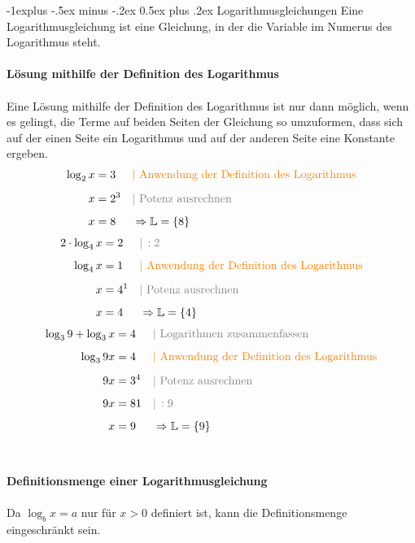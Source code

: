 \documentclass[a4paper,10pt]{article}
\makeatletter
\renewcommand{\subsection}{\@startsection{subsection}{2}{0mm}%
                                {-1explus -.5ex minus -.2ex}%
                                {0.5ex plus .2ex}%
                                {\normalfont\normalsize\bfseries}}
\makeatother
\begin{document}
\begin{multicols}{3}
    \subsection{Logarithmus­gleichungen}
    Eine Logarithmusgleichung ist eine Gleichung, in der die Variable im Numerus des Logarithmus steht. \\~\\
    \textbf{Lösung mithilfe der Definition des Logarithmus}\\~\\
    Eine Lösung mithilfe der Definition des Logarithmus ist nur dann möglich, wenn es gelingt, die Terme auf beiden Seiten der Gleichung so umzuformen, dass sich auf der einen Seite ein Logarithmus und auf der anderen Seite eine Konstante ergeben.
    \begin{align*} \log_{2}x &= 3 &&{\color{orange}| \text{ Anwendung der Definition des Logarithmus}} \\[5px] x &= 2^3 &&{\color{gray}| \text{ Potenz ausrechnen}} \\[5px] x &= 8 && \Rightarrow \mathbb{L} = \{8\} \end{align*}
    \begin{align*} 2 \cdot \log_{4}x &= 2 &&{\color{gray}|\, :2} \\[5px] \log_{4}x &= 1 &&{\color{orange}| \text{ Anwendung der Definition des Logarithmus}} \\[5px] x &= 4^1 &&{\color{gray}| \text{ Potenz ausrechnen}} \\[5px] x &= 4 && \Rightarrow \mathbb{L} = \{4\} \end{align*}
    \begin{align*} \log_{3}9 + \log_{3}x &= 4 &&{\color{gray}| \text{ Logarithmen zusammenfassen}} \\[5px] \log_{3}9x &= 4 &&{\color{orange}| \text{ Anwendung der Definition des Logarithmus}} \\[5px] 9x &= 3^4 &&{\color{gray}| \text{ Potenz ausrechnen}} \\[5px] 9x &= 81 &&{\color{gray}|\, :9} \\[5px] x &= 9 && \Rightarrow \mathbb{L} = \{9\} \end{align*}\\~\\
    \textbf{Definitionsmenge einer Logarithmusgleichung }\\~\\
    Da $\log_{b}x = a$  nur für $x > 0$ definiert ist, kann die Definitionsmenge eingeschränkt sein.


\end{multicols}
\end{document}
